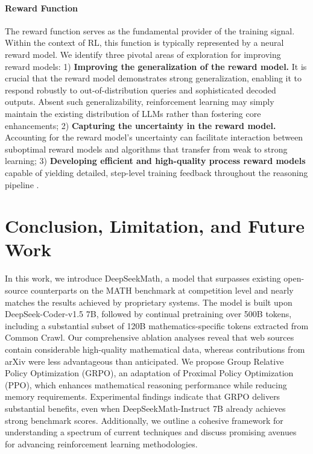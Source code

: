 \begin{itemize}[topsep=0pt]
\begin{itemize}[topsep=0pt]
\paragraph{Reward Function} The reward function serves as the fundamental provider of the training signal. Within the context of RL, this function is typically represented by a neural reward model. We identify three pivotal areas of exploration for improving reward models: 1) \textbf{Improving the generalization of the reward model.} It is crucial that the reward model demonstrates strong generalization, enabling it to respond robustly to out-of-distribution queries and sophisticated decoded outputs. Absent such generalizability, reinforcement learning may simply maintain the existing distribution of LLMs rather than fostering core enhancements; 2) \textbf{Capturing the uncertainty in the reward model.} Accounting for the reward model’s uncertainty can facilitate interaction between suboptimal reward models and algorithms that transfer from weak to strong learning; 3) \textbf{Developing efficient and high-quality process reward models} capable of yielding detailed, step-level training feedback throughout the reasoning pipeline \citep{lightman2023let,wang2023math}.

\section{Conclusion, Limitation, and Future Work} 

In this work, we introduce DeepSeekMath, a model that surpasses existing open-source counterparts on the MATH benchmark at competition level and nearly matches the results achieved by proprietary systems. The model is built upon DeepSeek-Coder-v1.5 7B, followed by continual pretraining over 500B tokens, including a substantial subset of 120B mathematics-specific tokens extracted from Common Crawl. Our comprehensive ablation analyses reveal that web sources contain considerable high-quality mathematical data, whereas contributions from arXiv were less advantageous than anticipated. We propose Group Relative Policy Optimization (GRPO), an adaptation of Proximal Policy Optimization (PPO), which enhances mathematical reasoning performance while reducing memory requirements. Experimental findings indicate that GRPO delivers substantial benefits, even when DeepSeekMath-Instruct 7B already achieves strong benchmark scores. Additionally, we outline a cohesive framework for understanding a spectrum of current techniques and discuss promising avenues for advancing reinforcement learning methodologies.


\end{itemize}
\end{itemize}
